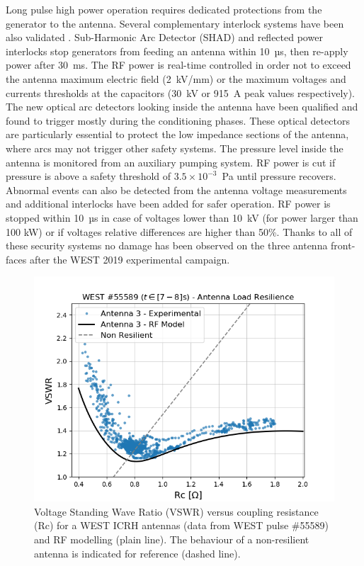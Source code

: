 {Long pulse high power operation requires dedicated protections from the generator to the antenna. Several complementary interlock systems have been also validated \cite{helou2019}. Sub-Harmonic Arc Detector (SHAD) and reflected power interlocks stop generators from feeding an antenna within 10~µs, then re-apply power after 30~ms. The RF power is real-time controlled in order not to exceed the antenna maximum electric field (2~kV/mm) or the maximum voltages and currents thresholds at the capacitors (30~kV or 915~A peak values respectively). The new optical arc detectors looking inside the antenna have been qualified and found to trigger mostly during the conditioning phases. These optical detectors are particularly essential to protect the low impedance sections of the antenna, where arcs may not trigger other safety systems. The pressure level inside the antenna is monitored from an auxiliary pumping system.  RF power is cut if pressure is above a safety threshold of $3.5\times10^{-3}$~Pa until pressure recovers. Abnormal events can also be detected from the antenna voltage measurements and additional interlocks have been added for safer operation. RF power is stopped within 10~µs in case of voltages lower than 10~kV (for power larger than 100 kW) or if voltages relative differences are higher than 50\%. Thanks to all of these security systems no damage has been observed on the three antenna front-faces after the WEST 2019 experimental campaign.

\begin{figure}
	\centering
	\includegraphics[width=0.7\linewidth]{figures/chap3/WEST_ICRH/WEST_ICRH_VSWR_vs_Rc}
	\caption{Voltage Standing Wave Ratio (VSWR) versus coupling resistance (Rc) for a WEST ICRH antennas (data from WEST pulse \#55589) and RF modelling (plain line). The behaviour of a non-resilient antenna is indicated for reference (dashed line).}
	\label{fig:westicrhvswrvsrc}
\end{figure}

}
